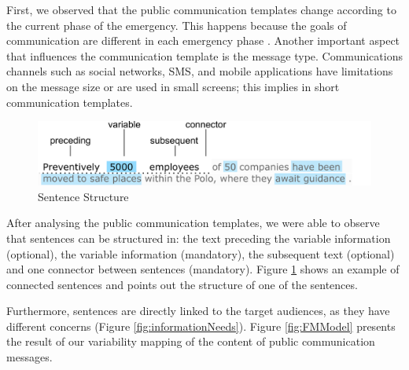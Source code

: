  First, we observed that the public communication templates change according to the current phase of the emergency. This happens because the goals of communication are different in each emergency phase \citep{cdc2014}. Another important aspect that influences the communication template is the message type. Communications channels such as social networks, SMS, and mobile applications have limitations on the message size or are used in small screens; this implies in short communication templates.
 
  \begin{figure}[]
\centering
\includegraphics[width=\linewidth]{images/sentenceStructure}
\caption{Sentence Structure}
\label{fig:sentencStructure}
\end{figure}

 
 After analysing the public communication templates, we were able to observe that sentences can be structured in: the text preceding the variable information (optional), the variable information (mandatory), the subsequent text (optional) and one connector between sentences (mandatory). Figure \ref{fig:sentencStructure}  shows an example of connected sentences and points out the structure of one of the sentences.
 
 Furthermore, sentences are directly linked to the target audiences, as they have different concerns (Figure \ref{fig:informationNeeds}). Figure \ref{fig:FMModel} presents the result of our variability mapping of the content of public communication messages.
 

